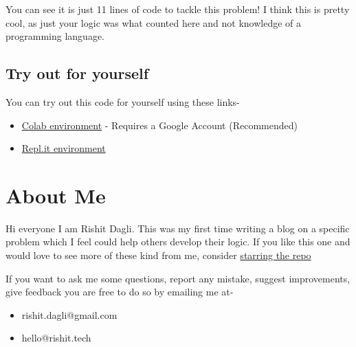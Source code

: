 \documentclass[12pt]{article}
\begin{document}
You can see it is just 11 lines of code to tackle this problem! I 
think this is pretty cool, as just your logic was what counted here
and not knowledge of a programming language.

\subsection*{Try out for yourself}

You can try out this code for yourself using these links-
\begin{itemize}
    \item \href{https://github.com/Rishit-dagli/SOTA-Coding-Problem/blob/master/A_SOTA_Coding_problem_solution.ipynb}{Colab environment} 
    - Requires a Google Account (Recommended)
    \item \href{https://repl.it/@RishitDagli/A-SOTA-Coding-Problem}{Repl.it environment}
\end{itemize}

\section*{About Me}

Hi everyone I am Rishit Dagli. This was my first time writing a blog
on a specific problem which I feel could help others develop their
logic. If you like this one and would love to see more of these kind
from me, consider 
\href{https://github.com/Rishit-dagli/SOTA-Coding-Problem}{starring 
the repo}

If you want to ask me some questions, report any mistake, suggest
improvements, give feedback you are free to do so by emailing me at-

\begin{itemize}
    \item rishit.dagli@gmail.com
    \item hello@rishit.tech
\end{itemize}
\end{document}
